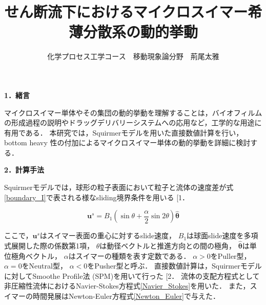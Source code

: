 \documentclass[twocolumns,10pt,a4j]{jarticle}
\title{\Large せん断流下におけるマイクロスイマー希薄分散系の動的挙動\vspace{-3truemm}}
\author{\large 化学プロセス工学コース　移動現象論分野　荊尾太雅\vspace{-10zh}}
\date{}
\makeatletter
\DeclareRobustCommand\cite{\unskip
  \@ifnextchar[{\@tempswatrue\@citex}{\@tempswafalse\@citex[]}}
\makeatother
\begin{document}



  \noindent
  \textbf{\large 1．緒言}
  \par
マイクロスイマー単体やその集団の動的挙動を理解することは，バイオフィルムの形成過程の説明やドラッグデリバリーシステムへの応用など，工学的な用途に有用である．
本研究では，Squirmerモデルを用いた直接数値計算を行い，bottom heavy 性の付加によるマイクロスイマー単体の動的挙動を詳細に検討する．


  \vspace{1.0truemm}
  \noindent
  \textbf{\large 2．計算手法}
  \par
Squirmerモデルでは，球形の粒子表面において粒子と流体の速度差が式\eqref{boundary_I}で表される様なsliding境界条件を用いる\cite{1}．

  \vspace{-3truemm}
    \begin{equation}
      \boldsymbol{u}^s = B_1 \left( \sin{\theta} + \frac{\alpha}{2} \sin{2\theta} \right) \hat{\boldsymbol{\theta}}
      \label{boundary_I}
    \end{equation}
  \vspace{-4truemm}

  \noindent
ここで，$\boldsymbol{u}^s$はスイマー表面の重心に対するslide速度，
$B_1$は球面slide速度を多項式展開した際の係数第1項，
$\theta$は動径ベクトルと推進方向との間の極角，
$\hat{\boldsymbol{\theta}}$は単位極角ベクトル，
$\alpha$はスイマーの種類を表す定数である．
$\alpha>0$をPuller型，
$\alpha=0$をNeutral型，
$\alpha<0$をPusher型と呼ぶ．
直接数値計算は，Squirmerモデルに対してSmoothe Profile法 (SPM)を用いて行った\cite{2}．
流体の支配方程式として非圧縮性流体におけるNavier-Stokes方程式\eqref{Navier_Stokes}を用いた．
また，スイマーの時間発展はNewton-Euler方程式\eqref{Newton_Euler}で与えた．
\end{document}
